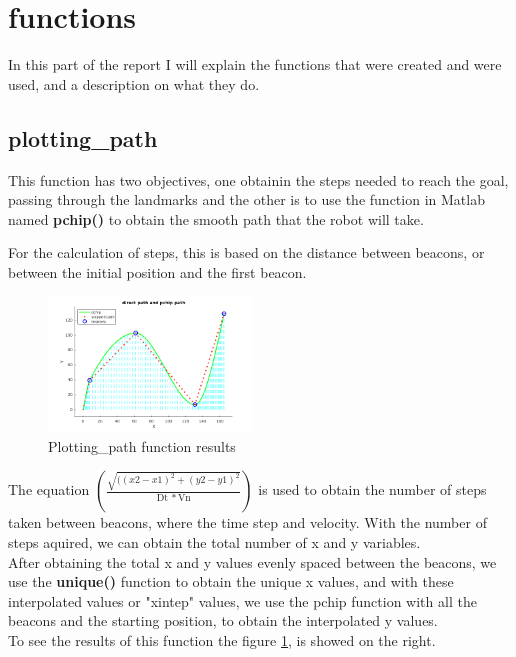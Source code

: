 \documentclass[runningheads]{llncs}
\begin{document}
\section{functions}
In this part of the report I will explain the functions that were created and were used, and a description on what they do. 


\subsection*{plotting\_path}
This function has two objectives, one obtainin the steps needed to reach the goal, passing through the landmarks 
and the other is to use the function in Matlab named \textbf{pchip()} to obtain the smooth path that the robot will take.

For the calculation of steps, this is based on the distance between beacons, or between the initial position and the first beacon.

\begin{figure}
    \centering
    \includegraphics[width=0.48\textwidth]{plotting_path.png}
    \caption{Plotting\_path function results}
    \label{plotting_path_fig}
\end{figure}

The equation \begin{math} \left(\frac{\sqrt{((x2-x1)^2+(y2-y1)^2}}{\mathrm{Dt}\, * \mathrm{Vn}}\right)
\end{math} is used to obtain the number of steps taken between beacons, where the time step and velocity.
With the number of steps aquired, we can obtain the total number of  x and y variables.
\\ 
After obtaining the total x and y values evenly spaced between the beacons, we use the \textbf{unique()} function to obtain the unique x values, 
and with these interpolated values or "xintep" values, we use the pchip function with all the beacons and the starting position, to obtain the interpolated y values. 
\\

To see the results of this function the figure \ref*{plotting_path_fig}, is showed on the right. 
\end{document}
